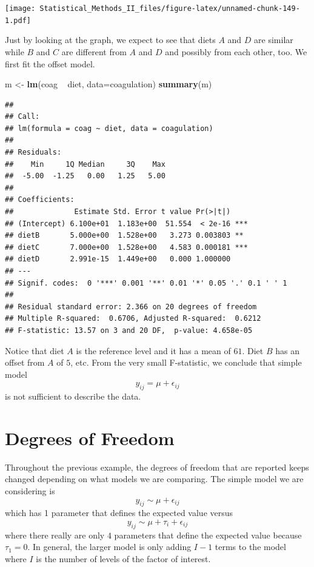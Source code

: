 \documentclass[]{book}
\newenvironment{Shaded}{\begin{snugshade}}{\end{snugshade}}
\newcommand{\KeywordTok}[1]{\textcolor[rgb]{0.13,0.29,0.53}{\textbf{{#1}}}}
\newcommand{\DataTypeTok}[1]{\textcolor[rgb]{0.13,0.29,0.53}{{#1}}}
\newcommand{\StringTok}[1]{\textcolor[rgb]{0.31,0.60,0.02}{{#1}}}
\newcommand{\NormalTok}[1]{{#1}}
\theoremstyle{definition}
\theoremstyle{definition}
\theoremstyle{remark}
\begin{document}
\texttt{[image: Statistical\_Methods\_II\_files/figure-latex/unnamed-chunk-149-1.pdf]}

Just by looking at the graph, we expect to see that diets \(A\) and
\(D\) are similar while \(B\) and \(C\) are different from \(A\) and
\(D\) and possibly from each other, too. We first fit the offset model.

\begin{Shaded}
\begin{Highlighting}[]
\NormalTok{m <-}\StringTok{ }\KeywordTok{lm}\NormalTok{(coag ~}\StringTok{ }\NormalTok{diet, }\DataTypeTok{data=}\NormalTok{coagulation)}
\KeywordTok{summary}\NormalTok{(m)}
\end{Highlighting}
\end{Shaded}

\begin{verbatim}
## 
## Call:
## lm(formula = coag ~ diet, data = coagulation)
## 
## Residuals:
##    Min     1Q Median     3Q    Max 
##  -5.00  -1.25   0.00   1.25   5.00 
## 
## Coefficients:
##              Estimate Std. Error t value Pr(>|t|)    
## (Intercept) 6.100e+01  1.183e+00  51.554  < 2e-16 ***
## dietB       5.000e+00  1.528e+00   3.273 0.003803 ** 
## dietC       7.000e+00  1.528e+00   4.583 0.000181 ***
## dietD       2.991e-15  1.449e+00   0.000 1.000000    
## ---
## Signif. codes:  0 '***' 0.001 '**' 0.01 '*' 0.05 '.' 0.1 ' ' 1
## 
## Residual standard error: 2.366 on 20 degrees of freedom
## Multiple R-squared:  0.6706, Adjusted R-squared:  0.6212 
## F-statistic: 13.57 on 3 and 20 DF,  p-value: 4.658e-05
\end{verbatim}

Notice that diet \(A\) is the reference level and it has a mean of
\(61\). Diet \(B\) has an offset from \(A\) of \(5\), etc. From the very
small F-statistic, we conclude that simple model
\[y_{ij}=\mu+\epsilon_{ij}\] is not sufficient to describe the data.

\section{Degrees of Freedom}\label{degrees-of-freedom}

Throughout the previous example, the degrees of freedom that are
reported keeps changed depending on what models we are comparing. The
simple model we are considering is \[y_{ij}\sim\mu+\epsilon_{ij}\] which
has 1 parameter that defines the expected value versus
\[y_{ij}\sim\mu+\tau_{i}+\epsilon_{ij}\] where there really are only
\(4\) parameters that define the expected value because \(\tau_{1}=0\).
In general, the larger model is only adding \(I-1\) terms to the model
where \(I\) is the number of levels of the factor of interest.
\end{document}
